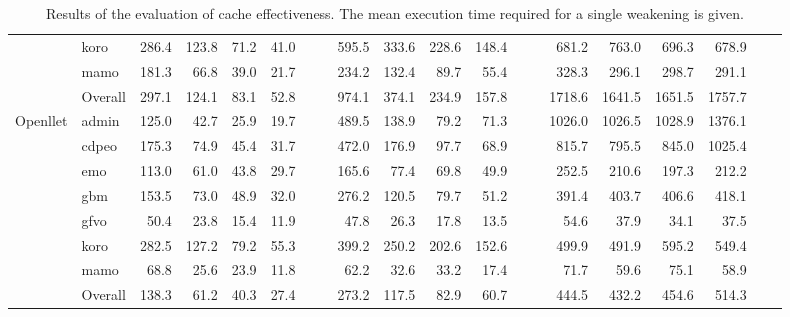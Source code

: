 \begin{table}[ht]
\begin{widepage}[4cm]
\begin{tabular}{|l|l|rrrrrr|rrrrrr|rrrrrr|}
      & koro
        & 286.4 & 123.8 & 71.2 & 41.0 & &
        & 595.5 & 333.6 & 228.6 & 148.4 & &
        & 681.2 & 763.0 & 696.3 & 678.9 & & \\
      & mamo
        & 181.3 & 66.8 & 39.0 & 21.7 & &
        & 234.2 & 132.4 & 89.7 & 55.4 & &
        & 328.3 & 296.1 & 298.7 & 291.1 & & \\
      \cline{2-20}
      & Overall
        & 297.1 & 124.1 & 83.1 & 52.8 & &
        & 974.1 & 374.1 & 234.9 & 157.8 & &
        & 1718.6 & 1641.5 & 1651.5 & 1757.7 & & \\
      \hline
      \multirow{8}{*}{Openllet} & admin
        & 125.0 & 42.7 & 25.9 & 19.7 & &
        & 489.5 & 138.9 & 79.2 & 71.3 & &
        & 1026.0 & 1026.5 & 1028.9 & 1376.1 & & \\
      & cdpeo
        & 175.3 & 74.9 & 45.4 & 31.7 & &
        & 472.0 & 176.9 & 97.7 & 68.9 & &
        & 815.7 & 795.5 & 845.0 & 1025.4 & & \\
      & emo
        & 113.0 & 61.0 & 43.8 & 29.7 & &
        & 165.6 & 77.4 & 69.8 & 49.9 & &
        & 252.5 & 210.6 & 197.3 & 212.2 & & \\
      & gbm
        & 153.5 & 73.0 & 48.9 & 32.0 & &
        & 276.2 & 120.5 & 79.7 & 51.2 & &
        & 391.4 & 403.7 & 406.6 & 418.1 & & \\
      & gfvo
        & 50.4 & 23.8 & 15.4 & 11.9 & &
        & 47.8 & 26.3 & 17.8 & 13.5 & &
        & 54.6 & 37.9 & 34.1 & 37.5 & & \\
      & koro
        & 282.5 & 127.2 & 79.2 & 55.3 & &
        & 399.2 & 250.2 & 202.6 & 152.6 & &
        & 499.9 & 491.9 & 595.2 & 549.4 & & \\
      & mamo
        & 68.8 & 25.6 & 23.9 & 11.8 & &
        & 62.2 & 32.6 & 33.2 & 17.4 & &
        & 71.7 & 59.6 & 75.1 & 58.9 & & \\
      \cline{2-20}
      & Overall
        & 138.3 & 61.2 & 40.3 & 27.4 & &
        & 273.2 & 117.5 & 82.9 & 60.7 & &
        & 444.5 & 432.2 & 454.6 & 514.3 & & \\
      \hline
    \end{tabular}
  \end{widepage}
  \caption{Results of the evaluation of cache effectiveness. The mean execution time required for a single weakening is given.}
\end{table}

